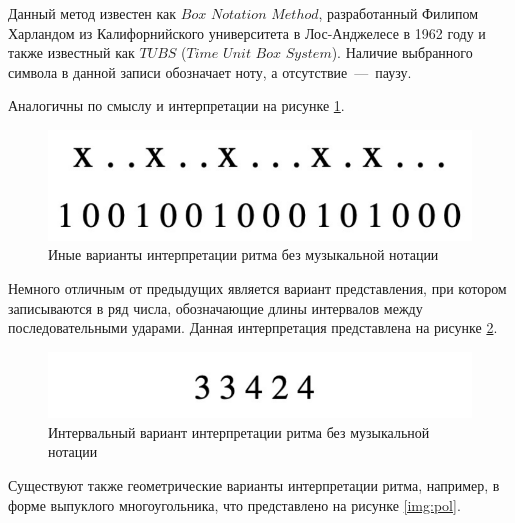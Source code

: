 Данный метод известен как $Box$ $Notation$ $Method$, разработанный Филипом Харландом из Калифорнийского университета в Лос-Анджелесе в 1962 году и также известный как $TUBS$ ($Time$ $Unit$ $Box$ $System$). Наличие выбранного символа в данной записи обозначает ноту, а отсутствие~---~паузу.

Аналогичны по смыслу и интерпретации на рисунке \ref{img:other}.

\begin{figure}[h!]
    \centering
    \includegraphics[scale=0.53]{img/other.pdf}
    \caption{Иные варианты интерпретации ритма без музыкальной нотации \cite{bib3}}
    \label{img:other}
\end{figure}

Немного отличным от предыдущих является вариант представления, при котором записываются в ряд числа, обозначающие длины интервалов между последовательными ударами. Данная интерпретация представлена на рисунке \ref{img:interv}.

\begin{figure}[h!]
    \centering
    \includegraphics[scale=0.53]{img/interv.pdf}
    \caption{Интервальный вариант интерпретации ритма без музыкальной нотации \cite{bib3}}
    \label{img:interv}
\end{figure}

Существуют также геометрические варианты интерпретации ритма, например, в форме выпуклого многоугольника, что представлено на рисунке \ref{img:pol}.

